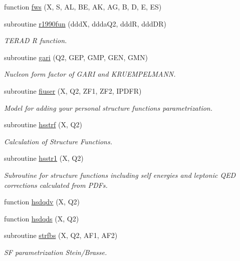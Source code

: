 \begin{DoxyCompactItemize}
\item 
function \hyperlink{djangoh__h_8f_a43045b5619ac8f061d9c7f0db0f8c3c3}{fws} (X, S, AL, BE, AK, AG, B, D, E, ES)
\item 
subroutine \hyperlink{djangoh__h_8f_a93ed5d17e768db4d2ddb8961a2cb6f19}{r1990fun} (dddX, ddda\+Q2, dddR, ddd\+DR)
\begin{DoxyCompactList}\small\item\em T\+E\+R\+AD R function. \end{DoxyCompactList}\item 
subroutine \hyperlink{djangoh__h_8f_ac2c3002554984491024373856487b617}{gari} (Q2, G\+EP, G\+MP, G\+EN, G\+MN)
\begin{DoxyCompactList}\small\item\em Nucleon form factor of G\+A\+RI and K\+R\+U\+E\+M\+P\+E\+L\+M\+A\+NN. \end{DoxyCompactList}\item 
subroutine \hyperlink{djangoh__h_8f_a20cb4156b04afea506f1cd18fafff26d}{fiuser} (X, Q2, Z\+F1, Z\+F2, I\+P\+D\+FR)
\begin{DoxyCompactList}\small\item\em Model for adding your personal structure functions parametrization. \end{DoxyCompactList}\item 
subroutine \hyperlink{djangoh__h_8f_aec939475b71b9ae0e410cb2a51bfd50a}{hsstrf} (X, Q2)
\begin{DoxyCompactList}\small\item\em Calculation of Structure Functions. \end{DoxyCompactList}\item 
subroutine \hyperlink{djangoh__h_8f_a5ea260f0282ee195444dff4b25214298}{hsstr1} (X, Q2)
\begin{DoxyCompactList}\small\item\em Subroutine for structure functions including self energies and leptonic Q\+ED corrections calculated from P\+D\+Fs. \end{DoxyCompactList}\item 
function \hyperlink{djangoh__h_8f_a90e6b56cb0363038734c1691a486d526}{hsdqdv} (X, Q2)
\item 
function \hyperlink{djangoh__h_8f_ac5b04e0e69f49199fe393e884e650faf}{hsdqds} (X, Q2)
\item 
subroutine \hyperlink{djangoh__h_8f_ae61727f178ec63c92a8830afc984437e}{strfbs} (X, Q2, A\+F1, A\+F2)
\begin{DoxyCompactList}\small\item\em SF parametrization Stein/\+Brasse. \end{DoxyCompactList}\item 

\end{DoxyCompactItemize}
